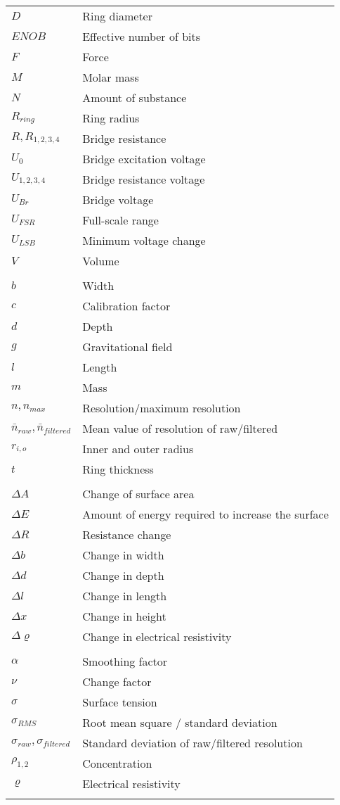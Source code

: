 %
\begin{longtable}[l]{@{}ll@{}}
	\( D \) & Ring diameter\\
	\( ENOB \) & Effective number of bits\\
	\( F \) & Force\\
	\( M \) & Molar mass\\
	\( N \) & Amount of substance\\
	\( R_{ring} \) & Ring radius\\
	\( R,R_{1,2,3,4} \) & Bridge resistance\\
	\( U_0 \) & Bridge excitation voltage\\
	\( U_{1,2,3,4} \) & Bridge resistance voltage\\
	\( U_{Br} \) & Bridge voltage\\
	\( U_{FSR} \) & Full-scale range\\
	\( U_{LSB} \) & Minimum voltage change\\
	\( V \) & Volume\\
	\\
	\( b \) & Width\\
	\( c \) & Calibration factor\\
	\( d \) & Depth\\
	\( g \) & Gravitational field\\
	\( l \) & Length\\
	\( m \) & Mass\\
	\( n, n_{max} \) & Resolution/maximum resolution\\
	\( \bar{n}_{raw}, \bar{n}_{filtered} \) & Mean value of resolution of raw/filtered\\
	\( r_{i,o} \) & Inner and outer radius\\
	\( t \) & Ring thickness\\
	\\
	\( \Delta A \) & Change of surface area\\
	\( \Delta E \) & Amount of energy required to increase the surface\\
	\( \Delta R \) & Resistance change\\
	\( \Delta b \) & Change in width\\
	\( \Delta d \) & Change in depth\\
	\( \Delta l \) & Change in length\\
	\( \Delta x \) & Change in height\\
	\( \Delta \varrho \) & Change in electrical resistivity\\
	\\
	\( \alpha \) & Smoothing factor\\
	\( \nu \) & Change factor\\
	\( \sigma \) & Surface tension\\
	\( \sigma_{RMS} \) & Root mean square / standard deviation\\
	\( \sigma_{raw}, \sigma_{filtered} \) & Standard deviation of raw/filtered resolution\\
	\( \rho_{1,2} \) & Concentration\\
	\( \varrho \) & Electrical resistivity\\
	\label{tab:glossar}
\end{longtable}
